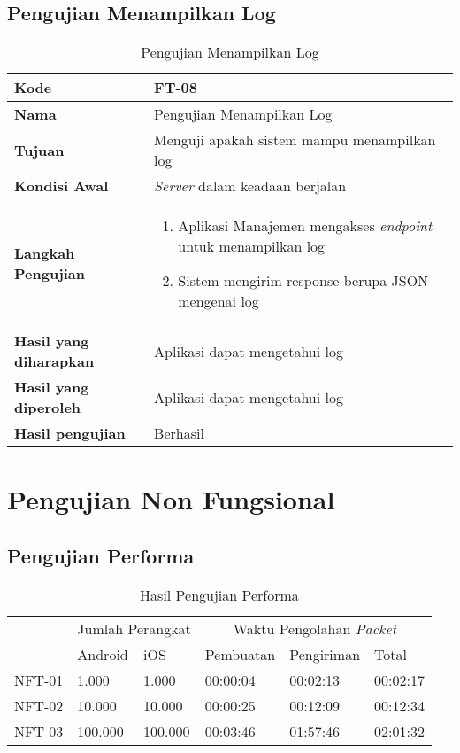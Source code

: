 \subsection{Pengujian Menampilkan Log}
\begin{longtable}{|p{2.5cm}|p{6.5cm}|}
	\caption{Pengujian Menampilkan Log} \label{t:uji_menampilkan_log} \\ \hline
	\textbf{Kode} & FT-08 \\ \hline
	\textbf{Nama} & Pengujian Menampilkan Log \\ \hline
	\textbf{Tujuan} & Menguji apakah sistem mampu menampilkan log \\ \hline
	\textbf{Kondisi Awal} &  \textit{Server} dalam keadaan berjalan\\ \hline
	\textbf{Langkah Pengujian} &  
	\begin{enumerate}
		\item Aplikasi Manajemen mengakses \textit{endpoint} untuk menampilkan log
		\item Sistem mengirim response berupa JSON mengenai log
	\end{enumerate} \\ \hline
	\textbf{Hasil yang diharapkan} & Aplikasi dapat mengetahui log \\ \hline
	\textbf{Hasil yang diperoleh} & Aplikasi dapat mengetahui log \\ \hline
	\textbf{Hasil pengujian} & Berhasil \\ \hline
\end{longtable}
\section{Pengujian Non Fungsional}

\subsection{Pengujian Performa}
\begin{longtable}{|p{1.3cm}|p{1.3cm}|p{1.3cm}|p{1.8cm}|p{1.8cm}|p{1.8cm}|}
	\caption{Hasil Pengujian Performa} \label{t:performa} \\ \hline
	\rowcolor{gray!10} & \multicolumn{2}{c|}{Jumlah Perangkat} & \multicolumn{3}{c|}{Waktu Pengolahan \textit{Packet}} \\ \hhline{~|*5{-}|}
	\rowcolor{gray!10} \multirow{-2}{*}{Kode} & Android & iOS & Pembuatan & Pengiriman & Total \\ \hline
	NFT-01 & 1.000 & 1.000 & 00:00:04 & 00:02:13 & 00:02:17 \\ \hline
	NFT-02 & 10.000 & 10.000 & 00:00:25 & 00:12:09 & 00:12:34 \\ \hline
	NFT-03 & 100.000 & 100.000 & 00:03:46 & 01:57:46 & 02:01:32 \\ \hline
\end{longtable}

